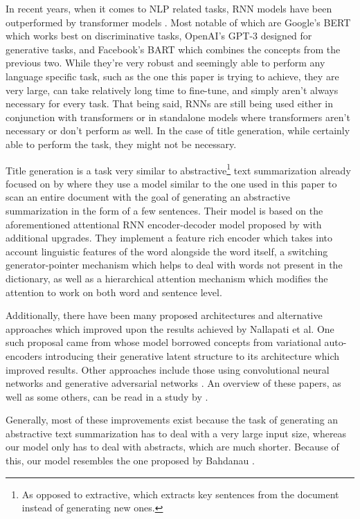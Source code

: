 \documentclass{article}
\begin{document}
In recent years, when it comes to NLP related tasks, RNN models have been outperformed by transformer models \citep{transformers}. Most notable of which are Google's BERT \citep{bert} which works best on discriminative tasks, OpenAI's GPT-3 \citep{gpt3} designed for generative tasks, and Facebook's BART \citep{bart} which combines the concepts from the previous two. While they're very robust and seemingly able to perform any language specific task, such as the one this paper is trying to achieve, they are very large, can take relatively long time to fine-tune, and simply aren't always necessary for every task. That being said, RNNs are still being used either in conjunction with transformers or in standalone models where transformers aren't necessary or don't perform as well. In the case of title generation, while certainly able to perform the task, they might not be necessary.

Title generation is a task very similar to abstractive\footnote{As opposed to extractive, which extracts key sentences from the document instead of generating new ones.} text summarization already focused on by \cite{abstractive-text} where they use a model similar to the one used in this paper to scan an entire document with the goal of generating an abstractive summarization in the form of a few sentences. Their model is based on the aforementioned attentional RNN encoder-decoder model proposed by \cite{bahdanau} with additional upgrades. They implement a feature rich encoder which takes into account linguistic features of the word alongside the word itself, a switching generator-pointer mechanism which helps to deal with words not present in the dictionary, as well as a hierarchical attention mechanism which modifies the attention to work on both word and sentence level.

Additionally, there have been many proposed architectures and alternative approaches which improved upon the results achieved by Nallapati et al. One such proposal came from \cite{abs-improve} whose model borrowed concepts from variational auto-encoders introducing their generative latent structure to its architecture which improved results. Other approaches include those using convolutional neural networks \citep{cnn-abs} and generative adversarial networks \citep{gan}. An overview of these papers, as well as some others, can be read in a study by \cite{overview}.

Generally, most of these improvements exist because the task of generating an abstractive text summarization has to deal with a very large input size, whereas our model only has to deal with abstracts, which are much shorter. Because of this, our model resembles the one proposed by Bahdanau \citep{bahdanau}.
\end{document}
